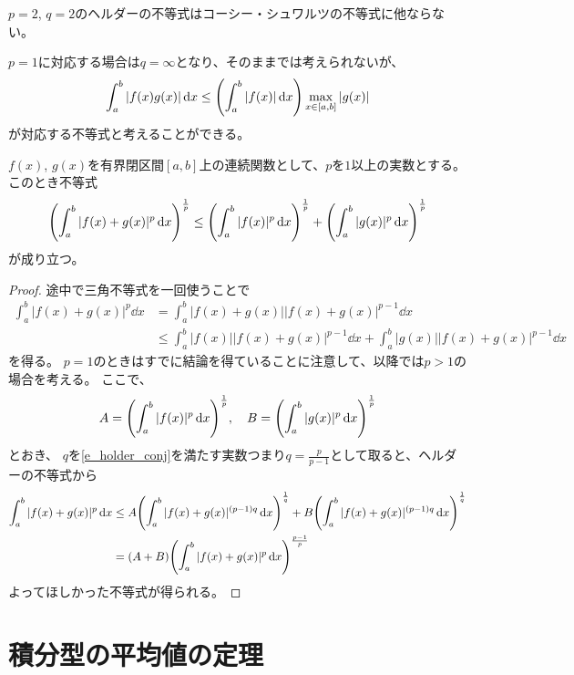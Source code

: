 \begin{remark}
$p = 2$, $q = 2$のヘルダーの不等式はコーシー・シュワルツの不等式に他ならない。
\end{remark}

\begin{remark}
$p = 1$に対応する場合は$q = \infty$となり、そのままでは考えられないが、
$$
\int_a^b |f(x)g(x)|\dd{x} \le \qty(\int_a^b |f(x)|\dd{x})\max_{x \in [a, b]}|g(x)|
$$
が対応する不等式と考えることができる。
\end{remark}

\begin{theorem}[ミンコフスキーの不等式]
$f(x)$, $g(x)$を有界閉区間$[a, b]$上の連続関数として、$p$を$1$以上の実数とする。
このとき不等式
$$
\qty(\int_a^b |f(x)+g(x)|^p\dd{x})^{\frac{1}{p}} \le \qty(\int_a^b |f(x)|^p\dd{x})^{\frac{1}{p}}+\qty(\int_a^b |g(x)|^p\dd{x})^{\frac{1}{p}}
$$
が成り立つ。
\end{theorem}

\begin{proof}
途中で三角不等式を一回使うことで
$$
\begin{aligned}
\int_a^b |f(x)+g(x)|^p\dd{x}
&= \int_a^b |f(x)+g(x)||f(x)+g(x)|^{p-1}\dd{x} \\
&\le \int_a^b |f(x)||f(x)+g(x)|^{p-1}\dd{x}+\int_a^b |g(x)||f(x)+g(x)|^{p-1}\dd{x}
\end{aligned}
$$
を得る。
$p = 1$のときはすでに結論を得ていることに注意して、以降では$p > 1$の場合を考える。
ここで、
$$
A = \qty(\int_a^b |f(x)|^p\dd{x})^{\frac{1}{p}},
\quad B = \qty(\int_a^b |g(x)|^p\dd{x})^{\frac{1}{p}}
$$
とおき、
$q$を\eqref{e_holder_conj}を満たす実数つまり$q = \frac{p}{p-1}$として取ると、ヘルダーの不等式から
$$
\begin{aligned}
\int_a^b |f(x)+g(x)|^p\dd{x}
&\le A\qty(\int_a^b |f(x)+g(x)|^{(p-1)q}\dd{x})^{\frac{1}{q}}+B\qty(\int_a^b |f(x)+g(x)|^{(p-1)q}\dd{x})^{\frac{1}{q}} \\
&= (A+B)\qty(\int_a^b |f(x)+g(x)|^p\dd{x})^{\frac{p-1}{p}}
\end{aligned}
$$
よってほしかった不等式が得られる。
\end{proof}

\begin{theorem}[イェンセンの不等式]
\end{theorem}

\section{積分型の平均値の定理}

